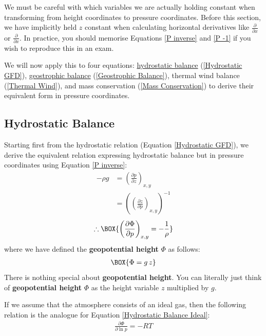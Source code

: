 We must be careful with which variables we are actually holding constant when transforming from height coordinates to pressure coordinates. Before this section, we have implicitly held $z$ constant when calculating horizontal derivatives like $\frac{\partial}{\partial x}$ or $\frac{\partial}{\partial x}$. In practice, you should memorise Equations \ref{P inverse} and \ref{P -1} if you wish to reproduce this in an exam.

We will now apply this to four equations: \hyperref[Hydrostatic GFD Box]{hydrostatic balance} (\ref{Hydrostatic GFD}), \hyperref[Geostrophic Box]{geostrophic balance} (\ref{Geostrophic Balance}), thermal wind balance (\ref{Thermal Wind}), and mass conservation (\ref{Mass Conservation}) to derive their equivalent form in pressure coordinates. 

\subsection{Hydrostatic Balance}

Starting first from the hydrostatic relation (Equation \ref{Hydrostatic GFD}), we derive the equivalent relation expressing hydrostatic balance but in pressure coordinates using Equation \ref{P inverse}:
\begin{align*}
    -\rho g &= \left( \frac{\partial p}{\partial z} \right)_{x,y}
    \\
    &=\left( \left( \frac{\partial z}{\partial p} \right)_{x,y} \right)^{-1}
\end{align*}
\begin{align}
    \label{Hydrostatic Pressure}
    \therefore \BOX{
        \left( \frac{\partial \Phi}{\partial p} \right)_{x,y}
        =-\frac{1}{\rho}
    }
\end{align}
where we have defined the \textbf{geopotential height} $\Phi$ as follows:
\begin{align}
    \BOX{\Phi =g\,z}
\end{align}
There is nothing special about \textbf{geopotential height}. You can literally just think of \textbf{geopotential height} $\Phi$ as the height variable $z$ multiplied by $g$. 

If we assume that the atmosphere consists of an ideal gas, then the following relation is the analogue for Equation \ref{Hydrostatic Balance Ideal}:
\begin{align}
    \boxed{\frac{\partial \Phi}{\partial \ln p}=-RT}
    \label{Hydrostatic Pressure Ideal}
\end{align}


